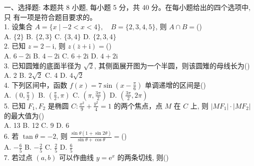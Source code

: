 \documentclass[UTF8]{ctexart}
\begin{document}
	
	一、选择题: 本题共 8 小题, 每小题 5 分，共 40 分。在每小题给出的四个选项中, 只
	有一项是符合题目要求的。\\
	
	1. 设集合 $A=\{x \mid-2<x<4\}, \quad B=\{2,3,4,5\}$, 则 $A \cap B=$(\qquad)\\
	
	A. $\{2\}$\qquad
	B. $\{2,3\}$\qquad
	C. $\{3,4\}$\qquad
	D. $\{2,3,4\}$\\
	
	2. 已知 $z=2-\mathrm{i}$, 则 $z(\bar{z}+\mathrm{i})=$(\qquad)\\
	
	A. $6-2 \mathrm{i}$\qquad
	B. $4-2 \mathrm{i}$\qquad
	C. $6+2 \mathrm{i}$\qquad
	D. $4+2 \mathrm{i}$\\
	
	3. 已知圆雉的底面半径为 $\sqrt{2}$, 其侧面展开图为一个半圆，则该圆雉的母线长为(\qquad)\\
	
	A. 2\qquad
	B. $2 \sqrt{2}$\qquad
	C. 4\qquad
	D. $4 \sqrt{2}$\\
	
	4. 下列区间中，函数 $f(x)=7 \sin \left(x-\displaystyle{\frac{\pi}{6}}\right)$ 单调递增的区间是(\qquad)\\
	
	A. $\left(0, \displaystyle{\frac{\pi}{2}}\right)$\qquad
	B. $\left(\displaystyle{\frac{\pi}{2}}, \pi\right)$\qquad
	C. $\left(\pi, \displaystyle{\frac{3 \pi}{2}}\right)$\qquad
	D. $\left(\displaystyle{\frac{3 \pi}{2}}, 2 \pi\right)$\\
	
	5. 已知 $F_{1}, F_{2}$ 是椭圆 $C: \displaystyle{\frac{x^{2}}{9}}+\displaystyle{\frac{y^{2}}{4}}=1$ 的两个焦点，点 $M$ 在 $C$ 上, 则 $\left|M F_{1}\right| \cdot\left|M F_{2}\right|$ 的最大值为(\qquad)\\
	
	A. 13\qquad
	B. 12\qquad
	C. 9\qquad
	D. 6\\
	
	6. 若 $\tan \theta=-2$, 则 $ \displaystyle{\frac{\sin \theta(1+\sin 2 \theta)}{\sin \theta+\cos \theta}}=$(\qquad)\\
	
	A. $-\displaystyle{\frac{6}{5}}$\qquad
	B. $-\displaystyle{\frac{2}{5}}$\qquad
	C. $\displaystyle{\frac{2}{5}}$\qquad
	D. $\displaystyle{\frac{6}{5}}$ 
	\\
	
	7. 若过点 $(a, b)$ 可以作曲线 $y=\mathrm{e}^{x}$ 的两条切线, 则(\qquad)\\
	
\end{document}
